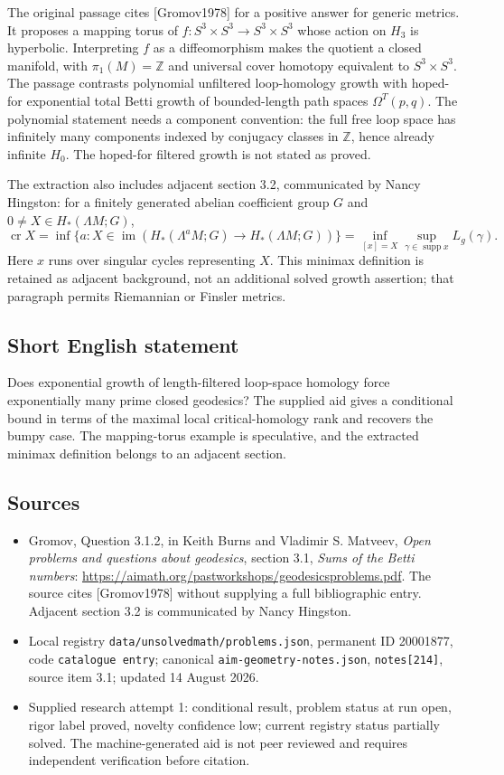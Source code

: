 \documentclass[11pt]{article}
\newcommand{\Z}{\mathbb{Z}}
\begin{document}
The original passage cites [Gromov1978] for a positive answer for generic metrics. It proposes a mapping torus of \(f:S^3\times S^3\to S^3\times S^3\) whose action on \(H_3\) is hyperbolic. Interpreting \(f\) as a diffeomorphism makes the quotient a closed manifold, with \(\pi_1(M)=\Z\) and universal cover homotopy equivalent to \(S^3\times S^3\). The passage contrasts polynomial unfiltered loop-homology growth with hoped-for exponential total Betti growth of bounded-length path spaces \(\Omega^T(p,q)\). The polynomial statement needs a component convention: the full free loop space has infinitely many components indexed by conjugacy classes in \(\Z\), hence already infinite \(H_0\). The hoped-for filtered growth is not stated as proved.

The extraction also includes adjacent section 3.2, communicated by Nancy Hingston: for a finitely generated abelian coefficient group \(G\) and \(0\ne X\in H_*(\Lambda M;G)\),
\[
\operatorname{cr}X=\inf\{a:X\in\operatorname{im}(H_*(\Lambda^aM;G)\to H_*(\Lambda M;G))\}
=\inf_{[x]=X}\sup_{\gamma\in\operatorname{supp}x}L_g(\gamma).
\]
Here \(x\) runs over singular cycles representing \(X\). This minimax definition is retained as adjacent background, not an additional solved growth assertion; that paragraph permits Riemannian or Finsler metrics.
\subsection{Short English statement}
Does exponential growth of length-filtered loop-space homology force exponentially many prime closed geodesics? The supplied aid gives a conditional bound in terms of the maximal local critical-homology rank and recovers the bumpy case. The mapping-torus example is speculative, and the extracted minimax definition belongs to an adjacent section.
\subsection{Sources}
\begin{itemize}
\item Gromov, Question 3.1.2, in Keith Burns and Vladimir S. Matveev, \emph{Open problems and questions about geodesics}, section 3.1, \emph{Sums of the Betti numbers}: \url{https://aimath.org/pastworkshops/geodesicsproblems.pdf}. The source cites [Gromov1978] without supplying a full bibliographic entry. Adjacent section 3.2 is communicated by Nancy Hingston.
\item Local registry \texttt{data/unsolvedmath/problems.json}, permanent ID 20001877, code \texttt{catalogue entry}; canonical \texttt{aim-geometry-notes.json}, \texttt{notes[214]}, source item 3.1; updated 14 August 2026.
\item Supplied research attempt 1: conditional result, problem status at run open, rigor label proved, novelty confidence low; current registry status partially solved. The machine-generated aid is not peer reviewed and requires independent verification before citation.
\end{itemize}
\end{document}
